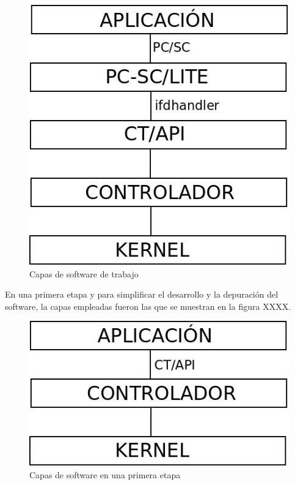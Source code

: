 \begin{figure}[H]
\centering
  \begin{center}
  \includegraphics[scale=.4]{Imagenes/SW_sc1.jpg} 
  \end{center}
  \caption{Capas de software de trabajo}\label{Fig:HW} 
\end{figure}

En una primera etapa y para simplificar el desarrollo y la depuración del software, la capas empleadas fueron las que se muestran en la figura XXXX.


\begin{figure}[H]
\centering
  \begin{center}
  \includegraphics[scale=.4]{Imagenes/SW_sc2.jpg} 
  \end{center}
  \caption{Capas de software en una primera etapa}\label{Fig:HW} 
\end{figure}

